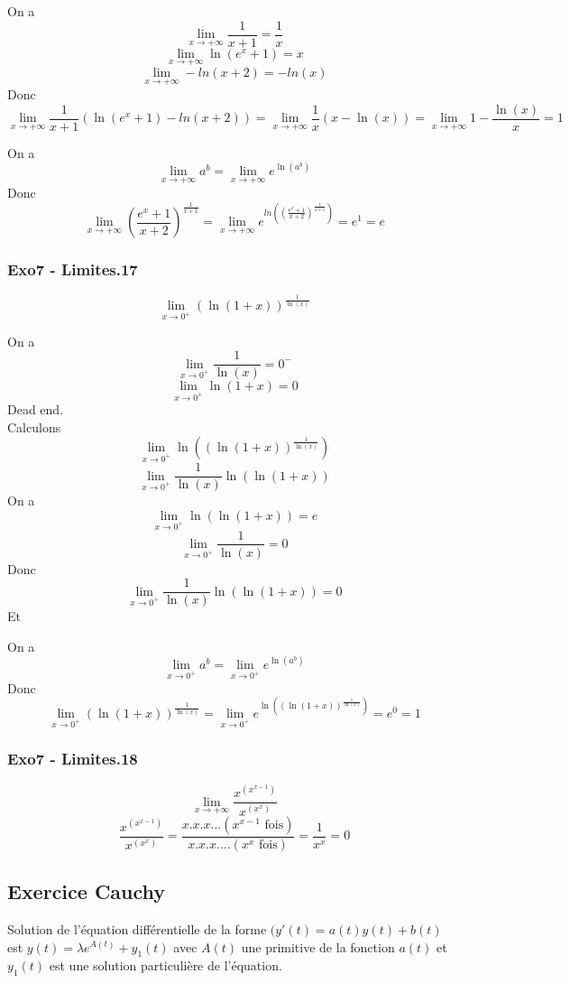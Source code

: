 \documentclass[]{book}
\theoremstyle{definition}
\begin{document}
On a 
$$\lim_{x \to +\infty}\frac{1}{x+1} = \frac{1}{x}$$
$$\lim_{x \to +\infty} \ln(e^x+1) = x$$
$$\lim_{x \to +\infty} -ln(x+2) = -ln(x)$$
Donc
$$\lim_{x \to +\infty}\frac{1}{x+1} (\ln(e^x+1)- ln(x+2)) = \lim_{x \to +\infty}\frac{1}{x}(x - \ln(x)) = \lim_{x \to +\infty} 1 - \frac{\ln(x)}{x} = 1$$

On a 
$$\lim_{x \to +\infty} a^b = \lim_{x \to +\infty} e^{\ln(a^b)}$$
Donc
$$\lim_{x \to +\infty} \left(\frac{e^x+1}{x+2}\right)^{\frac{1}{x+1}} = \lim_{x \to +\infty} e^{ln\left(\left(\frac{e^x+1}{x+2}\right)^{\frac{1}{x+1}}\right)} = e^1 = e$$

\subsubsection*{Exo7 - Limites.17}
$$\lim_{x \to 0^+} \left(\ln(1+x)\right)^{\frac{1}{\ln(x)}}$$

On a 
$$\lim_{x \to 0^+} \frac{1}{\ln(x)} = 0^{-}$$
$$\lim_{x \to 0^+} \ln(1+x) = 0$$
Dead end.\\

Calculons 
$$\lim_{x \to 0^+}\ln\left( \left(\ln(1+x)\right)^{\frac{1}{\ln(x)}} \right)$$
$$\lim_{x \to 0^+}\frac{1}{\ln(x)}\ln(\ln(1+x))$$
On a 
$$\lim_{x \to 0^+} \ln(\ln(1+x)) = e$$
$$\lim_{x \to 0^+} \frac{1}{\ln(x)} = 0$$
Donc
$$\lim_{x \to 0^+}\frac{1}{\ln(x)}\ln(\ln(1+x)) = 0$$
Et

On a 
$$\lim_{x \to 0^+} a^b = \lim_{x \to 0^+} e^{\ln(a^b)}$$
Donc
$$\lim_{x \to 0^+} \left(\ln(1+x)\right)^{\frac{1}{\ln(x)}} = \lim_{x \to 0^+}e^{\ln\left( \left(\ln(1+x)\right)^{\frac{1}{\ln(x)}} \right)} = e^0 = 1$$

\subsubsection*{Exo7 - Limites.18}
$$\lim_{x \to +\infty}\frac{x^{(x^{x-1})}}{x^{(x^{x})}}$$
$$\frac{x^{(x^{x-1})}}{x^{(x^{x})}} = \frac{x.x.x\ldots (x^{x-1} \textrm{ fois})}{x.x.x.\ldots (x^{x} \textrm{ fois})} =  \frac{1}{x^x} = 0$$


\newpage
\subsection*{Exercice Cauchy}
Solution de l'\'equation diff\'erentielle de la forme $(y'(t) = a(t)y(t) + b(t)$ est $y(t) = \lambda e^{A(t)}+y_1(t)$ avec $A(t)$ une primitive de la fonction $a(t)$ et $y_1(t)$ est une solution particuli\`ere de l'\'equation.\\
\end{document}
